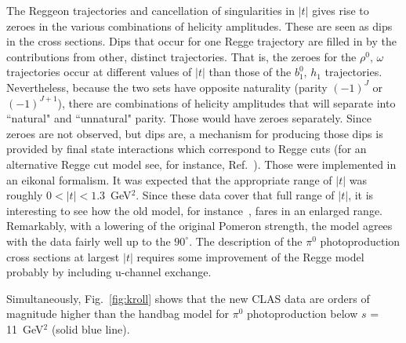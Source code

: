 \documentclass[aps,prc,twocolumn,floatfix,showpacs,preprintnumbers,amsmath,amssymb,superscriptaddress]{revtex4-1}
\begin{document}
The Reggeon trajectories and cancellation of singularities in $|t|$ 
gives rise to zeroes in the various combinations of helicity 
amplitudes. These are seen as dips in the cross sections. Dips that 
occur for one Regge trajectory are filled in by the contributions 
from other, distinct trajectories. That is, the zeroes for the 
$\rho^0, \, \omega$ trajectories occur at different values of $|t|$ 
than those of the $b_1^0, \, h_1$ trajectories. Nevertheless, 
because the two sets have opposite naturality (parity $(-1)^J$ or 
$(-1)^{J+1}$), there are combinations of helicity amplitudes that 
will separate into ``natural" and ``unnatural" parity.  Those would 
have zeroes separately. Since zeroes are not observed, but dips 
are, a mechanism for producing those dips is provided by final 
state interactions which correspond to Regge cuts (for an 
alternative Regge cut model see, for instance, Ref.~\cite{Laget}). 
Those were implemented in an eikonal formalism. It was expected 
that the appropriate range of $|t|$ was roughly $0 < |t| 
< 1.3$~GeV$^2$. Since these data cover that full range of $|t|$, it 
is interesting to see how the old model, for instance~\cite{Goldstein}, 
fares in an enlarged range. Remarkably, with a lowering of the 
original Pomeron strength, %
the model agrees with the data 
fairly well up to the $90^\circ$.  The description of the $\pi^0$ 
photoproduction cross sections at largest $|t|$ requires some
improvement of the Regge model probably by including u-channel 
exchange.

Simultaneously, Fig.~\ref{fig:kroll} shows that the new CLAS data 
are orders of magnitude higher than 
the handbag model for $\pi^0$ photoproduction below 
$s$ = 11~GeV$^2$ (solid blue line).
\end{document}
